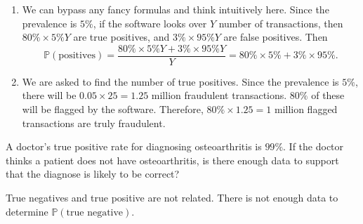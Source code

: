 \documentclass[../main.tex]{subfiles}
\begin{document}
\begin{exercise}
\begin{solution}
\begin{enumerate}
      \item We can bypass any fancy formulas and think intuitively here. Since the prevalence is \(5\%\), if the software looks over \(Y\) number of transactions, then \(80\% \times 5\% Y\) are true positives, and \(3\% \times 95\% Y\) are false positives. Then
        \[
          \mathbb{P}(\text{positives}) 
          = \frac{80\% \times 5\% Y + 3\% \times 95\% Y}{Y}
          = 80\% \times 5\% + 3\% \times 95\%.
        \]

      \item We are asked to find the number of true positives. Since the prevalence is \(5\%\), there will be \(0.05 \times 25 = 1.25\) million fraudulent transactions. \(80\%\) of these will be flagged by the software. Therefore, \(80\% \times 1.25 = 1\) million flagged transactions are truly fraudulent.
    \end{enumerate}
  \end{solution}
\end{exercise}

\begin{exercise}
  A doctor's true positive rate for diagnosing osteoarthritis is \(99\%\).  If the doctor thinks a patient does not have osteoarthritis, is there enough data to support that the diagnose is likely to be correct?

  \begin{solution}
    True negatives and true positive are not related. There is not enough data to determine \(\mathbb{P}(\text{true negative})\).
  \end{solution}
\end{exercise}
\end{document}
